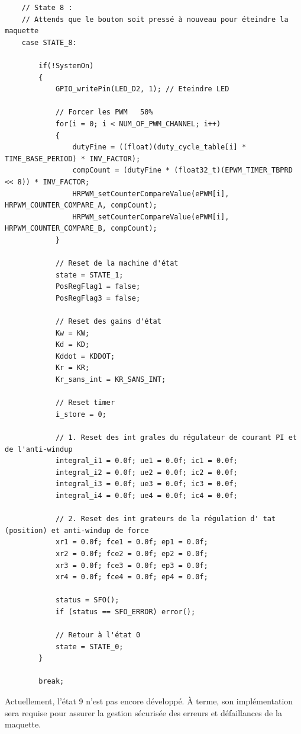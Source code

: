 \begin{verbatim}
    // State 8 :
    // Attends que le bouton soit pressé à nouveau pour éteindre la maquette
    case STATE_8:

        if(!SystemOn)
        {
            GPIO_writePin(LED_D2, 1); // Eteindre LED

            // Forcer les PWM   50%
            for(i = 0; i < NUM_OF_PWM_CHANNEL; i++)
            {
                dutyFine = ((float)(duty_cycle_table[i] * TIME_BASE_PERIOD) * INV_FACTOR);
                compCount = (dutyFine * (float32_t)(EPWM_TIMER_TBPRD << 8)) * INV_FACTOR;
                HRPWM_setCounterCompareValue(ePWM[i], HRPWM_COUNTER_COMPARE_A, compCount);
                HRPWM_setCounterCompareValue(ePWM[i], HRPWM_COUNTER_COMPARE_B, compCount);
            }

            // Reset de la machine d'état
            state = STATE_1;
            PosRegFlag1 = false;
            PosRegFlag3 = false;

            // Reset des gains d'état
            Kw = KW;
            Kd = KD;
            Kddot = KDDOT;
            Kr = KR;
            Kr_sans_int = KR_SANS_INT;

            // Reset timer
            i_store = 0;

            // 1. Reset des int grales du régulateur de courant PI et de l'anti-windup
            integral_i1 = 0.0f; ue1 = 0.0f; ic1 = 0.0f;
            integral_i2 = 0.0f; ue2 = 0.0f; ic2 = 0.0f;
            integral_i3 = 0.0f; ue3 = 0.0f; ic3 = 0.0f;
            integral_i4 = 0.0f; ue4 = 0.0f; ic4 = 0.0f;

            // 2. Reset des int grateurs de la régulation d' tat (position) et anti-windup de force
            xr1 = 0.0f; fce1 = 0.0f; ep1 = 0.0f;
            xr2 = 0.0f; fce2 = 0.0f; ep2 = 0.0f;
            xr3 = 0.0f; fce3 = 0.0f; ep3 = 0.0f;
            xr4 = 0.0f; fce4 = 0.0f; ep4 = 0.0f;

            status = SFO();
            if (status == SFO_ERROR) error();

            // Retour à l'état 0
            state = STATE_0;
        }

        break;
\end{verbatim}

Actuellement, l'état 9 n'est pas encore développé. À terme, son implémentation sera requise pour assurer la gestion sécurisée des erreurs et défaillances de la maquette.\\

